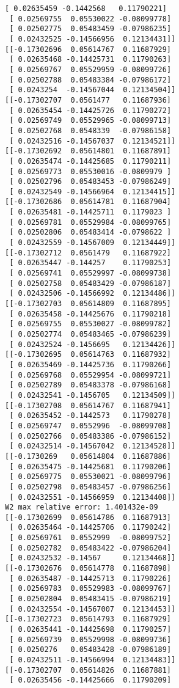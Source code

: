\documentclass[11pt]{article}
\begin{document}
\begin{Verbatim}[commandchars=\\\{\}]
 [ 0.02635459 -0.1442568   0.11790221]
 [ 0.02569755  0.05530022 -0.08099778]
 [ 0.02502775  0.05483459 -0.07986235]
 [ 0.02432525 -0.14566956  0.12134431]]
[[-0.17302696  0.05614767  0.11687929]
 [ 0.02635468 -0.14425731  0.11790263]
 [ 0.02569767  0.05529959 -0.08099726]
 [ 0.02502788  0.05483384 -0.07986172]
 [ 0.0243254  -0.14567044  0.12134504]]
[[-0.17302707  0.0561477   0.11687936]
 [ 0.02635454 -0.14425726  0.11790272]
 [ 0.02569749  0.05529965 -0.08099713]
 [ 0.02502768  0.0548339  -0.07986158]
 [ 0.02432516 -0.14567037  0.12134521]]
[[-0.17302692  0.05614801  0.11687891]
 [ 0.02635474 -0.14425685  0.11790211]
 [ 0.02569773  0.05530016 -0.0809979 ]
 [ 0.02502796  0.05483453 -0.07986249]
 [ 0.02432549 -0.14566964  0.12134415]]
[[-0.17302686  0.05614781  0.11687904]
 [ 0.02635481 -0.14425711  0.1179023 ]
 [ 0.02569781  0.05529984 -0.08099765]
 [ 0.02502806  0.05483414 -0.0798622 ]
 [ 0.02432559 -0.14567009  0.12134449]]
[[-0.17302712  0.0561479   0.11687922]
 [ 0.02635447 -0.144257    0.11790253]
 [ 0.02569741  0.05529997 -0.08099738]
 [ 0.02502758  0.05483429 -0.07986187]
 [ 0.02432506 -0.14566992  0.12134486]]
[[-0.17302703  0.05614809  0.11687895]
 [ 0.02635458 -0.14425676  0.11790218]
 [ 0.02569755  0.05530027 -0.08099782]
 [ 0.02502774  0.05483465 -0.07986239]
 [ 0.02432524 -0.1456695   0.12134426]]
[[-0.17302695  0.05614763  0.11687932]
 [ 0.02635469 -0.14425736  0.11790266]
 [ 0.02569768  0.05529954 -0.08099721]
 [ 0.02502789  0.05483378 -0.07986168]
 [ 0.02432541 -0.1456705   0.12134509]]
[[-0.17302708  0.05614767  0.11687941]
 [ 0.02635452 -0.1442573   0.11790278]
 [ 0.02569747  0.0552996  -0.08099708]
 [ 0.02502766  0.05483386 -0.07986152]
 [ 0.02432514 -0.14567042  0.12134528]]
[[-0.1730269   0.05614804  0.11687886]
 [ 0.02635475 -0.14425681  0.11790206]
 [ 0.02569775  0.05530021 -0.08099796]
 [ 0.02502798  0.05483457 -0.07986256]
 [ 0.02432551 -0.14566959  0.12134408]]
W2 max relative error: 1.401432e-09
[[-0.17302699  0.05614786  0.11687913]
 [ 0.02635464 -0.14425706  0.11790242]
 [ 0.02569761  0.0552999  -0.08099752]
 [ 0.02502782  0.05483422 -0.07986204]
 [ 0.02432532 -0.14567     0.12134468]]
[[-0.17302676  0.05614778  0.11687898]
 [ 0.02635487 -0.14425713  0.11790226]
 [ 0.02569783  0.05529983 -0.08099767]
 [ 0.02502804  0.05483415 -0.07986219]
 [ 0.02432554 -0.14567007  0.12134453]]
[[-0.17302723  0.05614793  0.11687929]
 [ 0.02635441 -0.14425698  0.11790257]
 [ 0.02569739  0.05529998 -0.08099736]
 [ 0.0250276   0.05483428 -0.07986189]
 [ 0.02432511 -0.14566994  0.12134483]]
[[-0.17302707  0.05614826  0.11687881]
 [ 0.02635456 -0.14425666  0.11790209]

\end{Verbatim}
\end{document}
